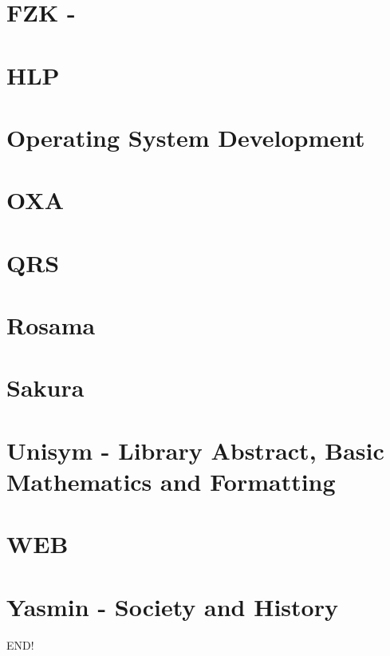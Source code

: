 \documentclass[a4paper,12pt,UTF8]{book}
\begin{document}
\chapter{FZK \mbox{-} }


\chapter{HLP}


\chapter{Operating System Development}


\chapter{OXA}


\chapter{QRS}


\chapter{Rosama}


\chapter{Sakura}


\chapter{Unisym \mbox{-} Library Abstract, Basic Mathematics and Formatting}


\chapter{WEB}


\chapter{Yasmin \mbox{-} Society and History}


\newpage
END!%
\end{document}
